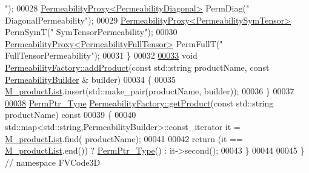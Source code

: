 \begin{DoxyCode}
{      "});
00028     \hyperlink{classFVCode3D_1_1PermeabilityProxy}{PermeabilityProxy<PermeabilityDiagonal>} PermDiag(\textcolor{stringliteral}{"
      DiagonalPermeability"});
00029     \hyperlink{classFVCode3D_1_1PermeabilityProxy}{PermeabilityProxy<PermeabilitySymTensor>} PermSymT(\textcolor{stringliteral}{"
      SymTensorPermeability"});
00030     \hyperlink{classFVCode3D_1_1PermeabilityProxy}{PermeabilityProxy<PermeabilityFullTensor>} PermFullT(\textcolor{stringliteral}{"
      FullTensorPermeability"});
00031 \}
00032 
\hypertarget{PermeabilityFactory_8cpp_source.tex_l00033}{}\hyperlink{classFVCode3D_1_1PermeabilityFactory_a3a160511216d3258029df8b84a7c322d}{00033} \textcolor{keywordtype}{void} \hyperlink{classFVCode3D_1_1PermeabilityFactory_a3a160511216d3258029df8b84a7c322d}{PermeabilityFactory::addProduct}(\textcolor{keyword}{const} std::string productName, \textcolor{keyword}{const} 
      \hyperlink{namespaceFVCode3D_ad92e05ac4c0491bab1c45e5457d2518c}{PermeabilityBuilder} & builder)
00034 \{
00035     \hyperlink{classFVCode3D_1_1PermeabilityFactory_a929e4768d02b4d006e8b2ace9dcc2354}{M\_productList}.insert(std::make\_pair(productName, builder));
00036 \}
00037 
\hypertarget{PermeabilityFactory_8cpp_source.tex_l00038}{}\hyperlink{classFVCode3D_1_1PermeabilityFactory_a1cba6a88ecaaf1c152877ab632381010}{00038} \hyperlink{namespaceFVCode3D_aee5ae48a57366603109f90f526a645b1}{PermPtr\_Type} \hyperlink{classFVCode3D_1_1PermeabilityFactory_a1cba6a88ecaaf1c152877ab632381010}{PermeabilityFactory::getProduct}(\textcolor{keyword}{const} std::string 
      productName)\textcolor{keyword}{ const}
00039 \textcolor{keyword}{}\{
00040     std::map<std::string,PermeabilityBuilder>::const\_iterator it = \hyperlink{classFVCode3D_1_1PermeabilityFactory_a929e4768d02b4d006e8b2ace9dcc2354}{M\_productList}.find(
      productName);
00041 
00042     \textcolor{keywordflow}{return} (it == \hyperlink{classFVCode3D_1_1PermeabilityFactory_a929e4768d02b4d006e8b2ace9dcc2354}{M\_productList}.end()) ? \hyperlink{namespaceFVCode3D_aee5ae48a57366603109f90f526a645b1}{PermPtr\_Type}() : it->second();
00043 \}
00044 
00045 \} \textcolor{comment}{// namespace FVCode3D}
\end{DoxyCode}
